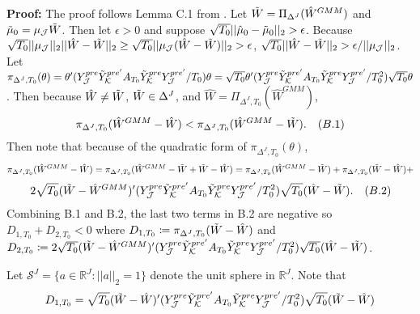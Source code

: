 \documentclass{article}
\begin{document}
\textbf{Proof:} The proof follows Lemma C.1 from \cite{Li2020}. Let $\Tilde{W} = \Pi_{\Delta^J}(\hat{W}^{GMM})$ and $\Tilde{\mu}_0 = \mu_{\mathcal{J}}\Tilde{W}$. Then let $\epsilon > 0$ and suppose $\sqrt{T_0}||\hat{\mu}_0 - \Tilde{\mu}_0||_2 > \epsilon$. Because $\sqrt{T_0}||\mu_{\mathcal{J}}||_2 ||\hat{W} - \Tilde{W}||_2 \geq \sqrt{T_0}||\mu_{\mathcal{J}}(\hat{W} - \Tilde{W})||_2 > \epsilon$, $\sqrt{T_0}||\hat{W} - \Tilde{W}||_2 > \epsilon/||\mu_{\mathcal{J}}||_2$. Let $\pi_{\Delta^J,T_0} (\theta) = \theta' (Y_{\mathcal{J}}^{pre} \Tilde{Y}_{\mathcal{K}}^{pre'} A_{T_{0}} \Tilde{Y}_{\mathcal{K}}^{pre} Y_{\mathcal{J}}^{pre'}/T_0) \theta = \sqrt{T_0}\theta' (Y_{\mathcal{J}}^{pre} \Tilde{Y}_{\mathcal{K}}^{pre'} A_{T_{0}} \Tilde{Y}_{\mathcal{K}}^{pre} Y_{\mathcal{J}}^{pre'}/T_0^2) \sqrt{T_0}\theta$. Then because $\hat{W} \ne \Tilde{W}$, $\Tilde{W} \in \Delta^J$, and $\hat{W} = \Pi_{\Delta^J, T_0} (\hat{W}^{GMM})$, $$\pi_{\Delta^J,T_0} (\hat{W}^{GMM} - \hat{W}) < \pi_{\Delta^J,T_0} (\hat{W}^{GMM} - \Tilde{W}). \quad (B.1)$$ Then note that because of the quadratic form of $\pi_{\Delta^J,T_0}(\theta)$, 
\begin{equation*}
    \pi_{\Delta^J,T_0}(\hat{W}^{GMM} - \hat{W}) = \pi_{\Delta^J,T_0}(\hat{W}^{GMM} - \Tilde{W} + \Tilde{W} - \hat{W}) = \pi_{\Delta^J,T_0}(\hat{W}^{GMM} - \Tilde{W}) + \pi_{\Delta^J,T_0}(\Tilde{W} - \hat{W}) + 
\end{equation*}
\begin{equation*}
    2\sqrt{T_0}(\Tilde{W} - \hat{W}^{GMM})'(Y_{\mathcal{J}}^{pre} \Tilde{Y}_{\mathcal{K}}^{pre'} A_{T_{0}} \Tilde{Y}_{\mathcal{K}}^{pre} Y_{\mathcal{J}}^{pre'}/T_0^2) \sqrt{T_0}(\hat{W} - \Tilde{W}). \quad (B.2)
\end{equation*}
Combining B.1 and B.2, the last two terms in B.2 are negative so $D_{1,T_0} + D_{2,T_0} < 0$ where $D_{1,T_0} \coloneqq \pi_{\Delta^J,T_0}(\Tilde{W} - \hat{W})$ and $D_{2,T_0} \coloneqq 2\sqrt{T_0}(\Tilde{W} - \hat{W}^{GMM})'(Y_{\mathcal{J}}^{pre} \Tilde{Y}_{\mathcal{K}}^{pre'} A_{T_{0}} \Tilde{Y}_{\mathcal{K}}^{pre} Y_{\mathcal{J}}^{pre'}/T_0^2) \sqrt{T_0}(\hat{W} - \Tilde{W})$.
\par 
Let $\mathcal{S}^J = \{a \in \mathbb{R}^J: ||a||_2 = 1\}$ denote the unit sphere in $\mathbb{R}^J$. Note that 
\begin{equation*}
    D_{1,T_0} = \sqrt{T_0}(\Tilde{W} - \hat{W})' (Y_{\mathcal{J}}^{pre} \Tilde{Y}_{\mathcal{K}}^{pre'} A_{T_{0}} \Tilde{Y}_{\mathcal{K}}^{pre} Y_{\mathcal{J}}^{pre'}/T_0^2) \sqrt{T_0}(\Tilde{W} - \hat{W})
\end{equation*}
\end{document}
